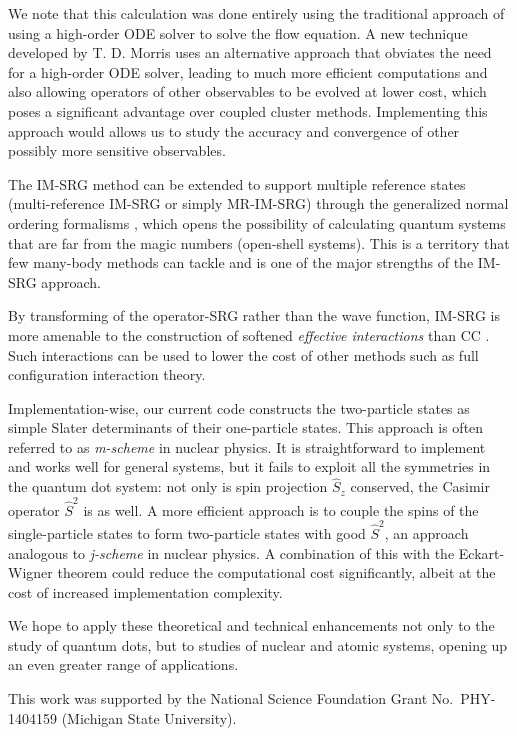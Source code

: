 We note that this calculation was done entirely using the traditional
approach of using a high-order ODE solver to solve the flow equation.
A new technique developed by T. D. Morris \cite{PhysRevC.92.034331}
uses an alternative approach that obviates the need for a high-order
ODE solver, leading to much more efficient computations and also
allowing operators of other observables to be evolved at lower cost,
which poses a significant advantage over coupled cluster methods.
Implementing this approach would allows us to study the accuracy and
convergence of other possibly more sensitive observables.

The IM-SRG method can be extended to support multiple reference states
(multi-reference IM-SRG or simply
MR-IM-SRG) \cite{PhysRevLett.110.242501,PhysRevC.90.041302} through
the generalized normal ordering
formalisms \cite{doi:10.1063/1.474405}, which opens the possibility of
calculating quantum systems that are far from the magic numbers
(open-shell systems).  This is a territory that few many-body methods
can tackle and is one of the major strengths of the IM-SRG approach.

By transforming of the operator-SRG rather than the wave function,
IM-SRG is more amenable to the construction of
softened \textit{effective interactions} than
CC \cite{Hergert2016165}.  Such interactions can be used to lower the
cost of other methods such as full configuration interaction theory.

Implementation-wise, our current code constructs the two-particle
states as simple Slater determinants of their one-particle states.
This approach is often referred to as \textit{m-scheme} in nuclear
physics.  It is straightforward to implement and works well for
general systems, but it fails to exploit all the symmetries in the
quantum dot system: not only is spin projection $\hat S_z$ conserved,
the Casimir operator $\hat S^2$ is as well.  A more efficient approach
is to couple the spins of the single-particle states to form
two-particle states with good $\hat S^2$, an approach analogous
to \textit{j-scheme} in nuclear physics.  A combination of this with
the Eckart-Wigner theorem could reduce the computational cost
significantly, albeit at the cost of increased implementation
complexity.


We hope to apply these theoretical and technical enhancements not only
to the study of quantum dots, but to studies of nuclear and atomic
systems, opening up an even greater range of applications.

\begin{acknowledgments}
  This work was supported by the National Science Foundation Grant
  No.\ PHY-1404159 (Michigan State University).
\end{acknowledgments}




